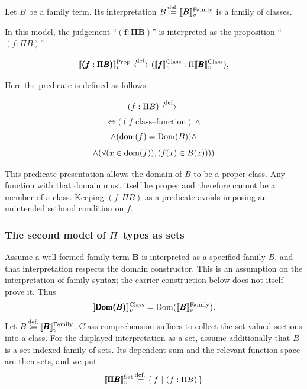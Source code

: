 Let $B$ be a family term. Its interpretation
$B\,{\stackrel{{\textrm{def.}}}{\coloneqq}}\,\llbracket \pmb{B} \rrbracket^{\text{Family}}_v$ is a family of classes.

In this model, the judgement ``$\pmb{(f:\Pi B)}$'' is interpreted as
the proposition ``$(f:\Pi B)$''.
\begin{definition}
\[
\llbracket
\pmb{(f:\Pi B)}
\rrbracket^{\mathrm{Prop}}_v
\ {\stackrel{{\textrm{def.}}}{\longleftrightarrow}}\ 
(
\llbracket
\pmb{f}
\rrbracket^{{\text{Class}}}_v
:\Pi
\llbracket
\pmb{B}
\rrbracket^{{\text{Class}}}_v
),
\]
\end{definition}
Here the predicate is defined as follows:
\begin{definition}
\[
(f:\Pi B)
\ {\stackrel{{\textrm{def.}}}{\longleftrightarrow}}\ 
\]
\[
\iff
(
(
f\text{ class--function})
\land
\]
\[
\land
(\mathrm{dom}(f)=\mathrm{Dom}(B))
\land
\]
\[
\land
(\forall (x\in\mathrm{dom}(f)), (f(x)\in B(x)) )
)
\]
\end{definition}
This predicate presentation allows the domain of $B$ to be a proper
class. Any function with that domain must itself be proper and therefore
cannot be a member of a class. Keeping $(f:\Pi B)$ as a predicate
avoids imposing an unintended sethood condition on $f$.


\subsubsection{The second model of $\Pi$--types as sets}
Assume a well-formed family term $\pmb{B}$ is interpreted as a
specified family $B$, and that interpretation respects the domain
constructor. This is an assumption on the interpretation of family
syntax; the carrier construction below does not itself prove it.
Thus
\[
\llbracket
\pmb{\mathrm{Dom}(B)}
\rrbracket^{{\text{Class}}}_v
=
\mathrm{Dom}(
\llbracket
\pmb{B}
\rrbracket^{\text{Family}}_v
).
\]
Let $B\,{\stackrel{{\textrm{def.}}}{\coloneqq}}\,\llbracket \pmb{B} \rrbracket^{\text{Family}}_v$.
Class comprehension suffices to collect the set-valued sections into a
class. For the displayed interpretation as a set, assume additionally
that $B$ is a set-indexed family of sets. Its dependent sum and the
relevant function space are then sets, and we put
\[
\llbracket
\pmb{\Pi B}
\rrbracket^{{\textrm{Set}}}_v
\,{\stackrel{{\textrm{def.}}}{\coloneqq}}\,
\left\{\,f\ \middle|\ (f:\Pi B)\,\right\}
\]


